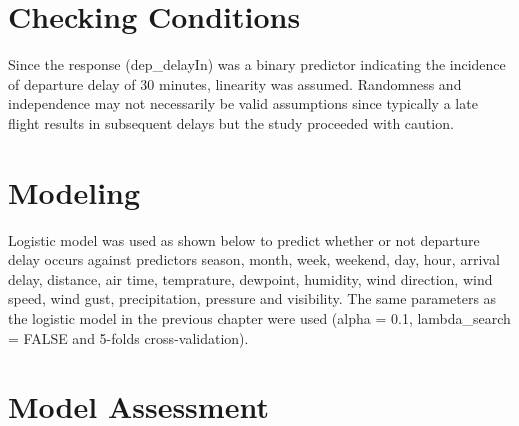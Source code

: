 \documentclass[12pt,twoside]{amherstthesis}
\begin{document}
  \section{Checking Conditions}\label{checking-conditions-1}
  
  Since the response (dep\_delayIn) was a binary predictor indicating the
  incidence of departure delay of 30 minutes, linearity was assumed.
  Randomness and independence may not necessarily be valid assumptions
  since typically a late flight results in subsequent delays but the study
  proceeded with caution.
  
  \section{Modeling}\label{modeling-1}
  
  Logistic model was used as shown below to predict whether or not
  departure delay occurs against predictors season, month, week, weekend,
  day, hour, arrival delay, distance, air time, temprature, dewpoint,
  humidity, wind direction, wind speed, wind gust, precipitation, pressure
  and visibility. The same parameters as the logistic model in the
  previous chapter were used (alpha = 0.1, lambda\_search = FALSE and
  5-folds cross-validation).
  
  \begin{Shaded}
  \begin{Highlighting}[]
  \StringTok{ }\NormalTok{(}\NormalTok{(}\NormalTok{)) }
   
  \StringTok{ }\NormalTok{(} \NormalTok{, } 
                      \NormalTok{,}
           \NormalTok{, } \NormalTok{, } \NormalTok{)}
  \end{Highlighting}
  \end{Shaded}
  
  \section{Model Assessment}\label{model-assessment-1}
  
\end{document}
